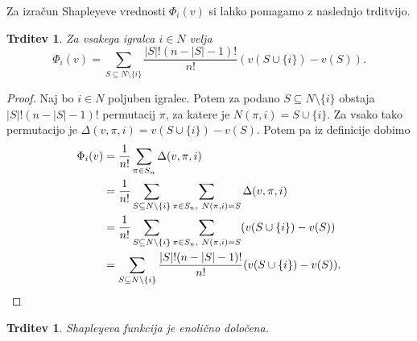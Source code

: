\documentclass[10pt, a4paper]{article}
\newtheorem{trditev}[izr]{Trditev}
\newenvironment{noticeC}{%
  \tcolorbox[%
  notitle,
  empty,
  enhanced,  %
  breakable,
  coltext=black, 
  fontupper=\rmfamily,
  noparskip,
  sharp corners,
  boxrule=-1pt,  %
  frame hidden,
  left=7pt,  %
  right=7pt,
  top=5pt,
  bottom=5pt,
  before skip=2.5ex plus 2pt,
  after skip=2.5ex plus 2pt,
  overlay unbroken and last={%
  },
  ]}
{\endtcolorbox}
\newenvironment{dokaz}%
  {\begin{noticeC}\begin{proof}}%
  {\end{proof}\end{noticeC}}
\begin{document}
Za izračun Shapleyeve vrednosti $\Phi_i (v)$ si lahko pomagamo z naslednjo trditvijo.

\begin{trditev}
  Za vsakega igralca $i \in N$ velja 
  $$\Phi_i (v) = \sum_{S \subseteq N \setminus \{i\}} \frac{|S|! (n - |S| - 1)!}{n!} (v(S \cup \{i\}) - v(S)).$$
\end{trditev}

\begin{dokaz}
  Naj bo $i \in N$ poljuben igralec. Potem za podano $S \subseteq N \setminus \{i\}$
  obstaja $|S|! (n - |S| - 1)!$ permutacij $\pi$, za katere je $N(\pi, i) = S \cup \{i\}$.
  Za vsako tako permutacijo je $\Delta(v, \pi, i) = v(S \cup \{i\}) - v(S)$.
  Potem pa iz definicije dobimo 
  \begin{align*}
    \Phi_i (v) &= \frac{1}{n!} \sum_{\pi \in S_n} \Delta(v, \pi, i)\\
    &= \frac{1}{n!} \sum_{S \subseteq N \setminus \{i\}} \sum_{\pi \in S_n,\ N(\pi, i) = S} \Delta(v, \pi, i)\\
    &= \frac{1}{n!} \sum_{S \subseteq N \setminus \{i\}} \sum_{\pi \in S_n,\ N(\pi, i) = S} (v(S \cup \{i\}) - v(S))\\
    &= \sum_{S \subseteq N \setminus \{i\}} \frac{|S|! (n - |S| - 1)!}{n!} (v(S \cup \{i\}) - v(S)). \qedhere
  \end{align*}
\end{dokaz}

\begin{trditev}
  Shapleyeva funkcija je enolično določena.
\end{trditev}
\end{document}
